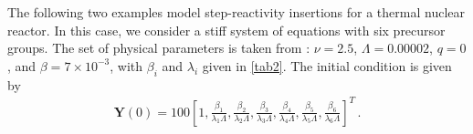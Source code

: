 \documentclass[preprint,12pt,authoryear]{elsarticle}
\begin{document}
The following two examples model step-reactivity insertions for a thermal nuclear reactor.
In this case, we consider a stiff system of equations with six precursor groups.
The set of physical parameters is taken from \citet{kinard_04}:
$\nu=2.5$, $\Lambda=0.00002$, $q=0$, and $\beta=7\times 10^{-3}$, with $\beta_i$ and $\lambda_i$ given in \cref{tab2}. The initial condition is given by
\begin{align}
\bm{Y}(0)=100 \left[1, \frac{\beta_1}{\lambda_1 \Lambda}, \frac{\beta_2}{\lambda_2 \Lambda}, \frac{\beta_3}{\lambda_3 \Lambda}, \frac{\beta_4}{\lambda_4 \Lambda}, \frac{\beta_5}{\lambda_5 \Lambda}, \frac{\beta_6}{\lambda_6 \Lambda}\right]^T\,.
\end{align}
\begin{table}[H]
\caption{Fraction of delayed neutrons and decay constants for the precursor groups.}\label{tab2}
\end{table}
\end{document}

